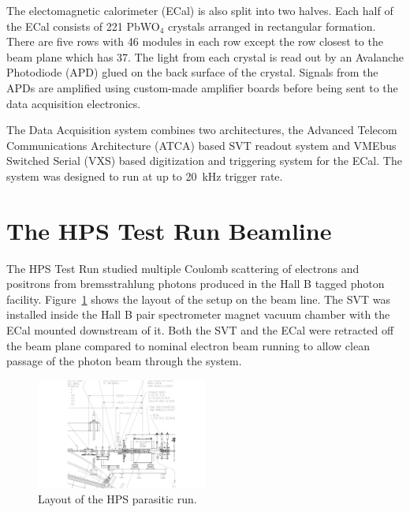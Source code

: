 \documentclass[final,3p,times,twocolumn]{elsarticle}
\begin{document}
The electomagnetic calorimeter (ECal) is also split into two halves. Each half of the ECal consists of 
221 PbWO$_4$ crystals arranged in rectangular formation. There are five rows with 46 modules in 
each row except the row closest to the beam plane which has 37. The light from each crystal 
is read out by an Avalanche Photodiode (APD) glued on the back surface of the crystal. 
Signals from the APDs are amplified using custom-made amplifier boards before being sent to the 
data acquisition electronics.

The  Data Acquisition system combines two architectures, the Advanced Telecom Communications 
Architecture (ATCA) based SVT readout system and VMEbus Switched Serial (VXS) based digitization 
and triggering system for the ECal. The system was designed to run at up to 20~kHz trigger rate.





\section{The HPS Test Run Beamline}
The HPS Test Run studied multiple Coulomb scattering of electrons and positrons from 
bremsstrahlung photons produced in the Hall B tagged photon facility. 
Figure~\ref{fig:hpstest_layout} shows the layout of 
the setup on the beam line. The SVT was installed inside the Hall B pair 
spectrometer magnet vacuum chamber with the ECal mounted downstream of it. Both the 
SVT and the ECal were retracted off the beam plane compared to nominal electron beam running to 
allow clean passage of the photon beam through the system. 
\begin{figure}[]
    \includegraphics[width=0.5\textwidth]{figures/HPS_dimensions}
\caption{\small{Layout of the HPS parasitic run.} }
\label{fig:hpstest_layout}
\end{figure}
\end{document}
